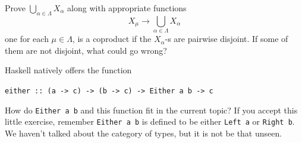 \begin{exercise}
  Prove \(\bigcup_{\alpha \in \Lambda} X_\alpha\) along with appropriate functions
  \[X_\mu \to \bigcup_{\alpha \in \Lambda} X_\alpha\] one for each
  \(\mu \in \Lambda\), is a coproduct if the \(X_\alpha\)-s are pairwise disjoint. If
  some of them are not disjoint, what could go wrong?
\end{exercise}

\begin{exercise}
  Haskell natively offers the function
  \begin{center} {\tt either :: (a -> c) -> (b -> c) -> Either a b -> c}
  \end{center}
  How do {\tt Either a b} and this function fit in the current topic?
  If you accept this little exercise, remember {\tt Either a b} is
  defined to be either {\tt Left a} or {\tt Right b}. We haven't talked
  about the category of types, but it is not be that unseen.
\end{exercise}

